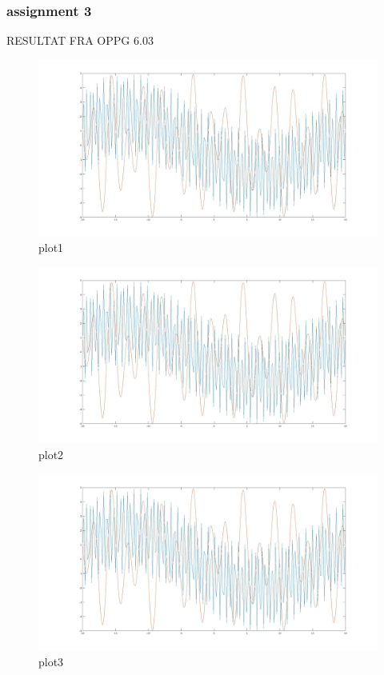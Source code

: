 \documentclass{article}
\begin{document}
\subsubsection{assignment 3}
RESULTAT FRA OPPG 6.03
\begin{figure}[h!]
    \centering
    \includegraphics[scale=0.15]{OPPG63.jpg}
    \caption{plot1}
    \label{fig:plot1}
\end{figure}

\begin{figure}[h!]
    \centering
    \includegraphics[scale=0.15]{OPPG63_1.jpg}
    \caption{plot2}
    \label{fig:plot2}
\end{figure}

\begin{figure}[h!]
    \centering
    \includegraphics[scale=0.15]{OPPG63_2.jpg}
    \caption{plot3}
    \label{fig:plot3}
\end{figure}
\end{document}
